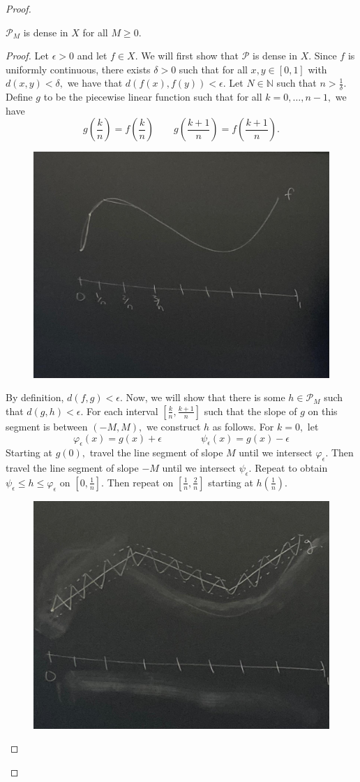 \documentclass[10pt, oneside]{article}
\newcommand{\bbN}{\mathbb{N}}
\theoremstyle{definition}
\begin{document}
\begin{proof}
\begin{lemma}
$\mathcal{P}_M$ is dense in $X$ for all $M \geq 0.$
\end{lemma}
\begin{proof}
    Let $\epsilon>0$ and let $f \in X.$ We will first show that $\mathcal{P}$ is dense in $X.$ Since $f$ is uniformly continuous, there exists $\delta>0$ such that for all $x, y\in [0,1]$ with $d(x,y) < \delta,$ we have that $d(f(x), f(y))< \epsilon.$ Let $N \in \bbN$ such that $n > \frac{1}{\delta}.$ Define $g$ to be the piecewise linear function such that for all $k  = 0, \dots, n-1,$ we have
    \[g(\frac{k}{n}) = f(\frac{k}{n}) \qquad g(\frac{k+1}{n}) = f(\frac{k+1}{n}).\]
    \begin{figure}[H]
        \centering
        \includegraphics[width=0.5\linewidth]{Images/WhatsApp Image 2025-05-23 at 11.46.10_213c88e5.jpg}
    \end{figure}
    By definition, $d(f,g) < \epsilon.$ Now, we will show that there is some $h \in \mathcal{P}_M$ such that $d(g,h) < \epsilon.$ For each interval $[\frac{k}{n}, \frac{k + 1}{n}]$ such that the slope of $g$ on this segment is between $(-M, M),$ we construct $h$ as follows. For $k = 0,$ let 
    \[\varphi_{\epsilon}(x) = g(x) + \epsilon\qquad \qquad \psi_\epsilon(x) = g(x) - \epsilon\] Starting at $g(0),$ travel the line segment of slope $M$ until we intersect $\varphi_\epsilon.$ Then travel the line segment of slope $-M$ until we intersect $\psi_\epsilon.$ Repeat to obtain $\psi_\epsilon \leq h \leq \varphi_\epsilon$ on $[0,\frac{1}{n}].$ Then repeat on $[\frac{1}{n}, \frac{2}{n}]$ starting at $h(\frac{1}{n}).$
\begin{figure}[H]
    \centering
    \includegraphics[width=0.5\linewidth]{Images/WhatsApp Image 2025-05-23 at 11.50.24_ebac9ac0.jpg}

\end{figure}
\end{proof}
\end{proof}
\end{document}
